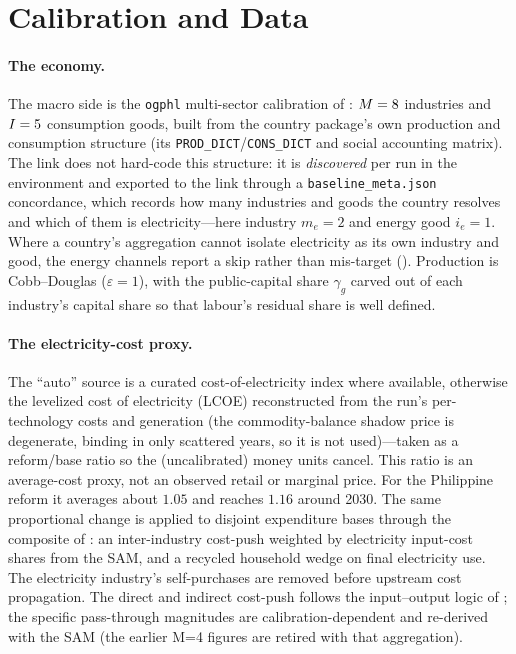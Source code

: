 \section{Calibration and Data}
\label{sec:calibration}

\paragraph{The economy.}
The macro side is the \texttt{ogphl} multi-sector calibration of \OGCore{}: $M=8$
industries and $I=5$ consumption goods, built from the country package's own
production and consumption structure (its \texttt{PROD\_DICT}/\texttt{CONS\_DICT} and
social accounting matrix). The link does not hard-code this structure: it is
\emph{discovered} per run in the \OGCore{} environment and exported to the link through a
\texttt{baseline\_meta.json} concordance, which records how many industries and goods the
country resolves and which of them is electricity---here industry $m_e=2$ and energy good
$i_e=1$. Where a country's aggregation cannot isolate electricity as its own industry and
good, the energy channels report a skip rather than mis-target ().
Production is Cobb--Douglas ($\varepsilon=1$), with the public-capital share
$\gamma_{g}$ carved out of each industry's capital share so that labour's residual share
is well defined.

\paragraph{The electricity-cost proxy.}
The ``auto'' source is a curated cost-of-electricity index where available, otherwise
the levelized cost of electricity (LCOE) reconstructed from the run's
per-technology costs and generation (the commodity-balance shadow price is degenerate,
binding in only scattered years, so it is not used)---taken as a reform/base ratio so the
(uncalibrated) money units cancel. This ratio is an average-cost proxy, not an observed
retail or marginal price. For the Philippine reform it averages about $1.05$ and reaches
$1.16$ around 2030. The same proportional change is applied to disjoint expenditure
bases through the composite of : an inter-industry cost-push weighted by
electricity input-cost shares from the SAM, and a recycled household wedge on final
electricity use. The electricity industry's self-purchases are removed before upstream
cost propagation. The direct and indirect cost-push follows the input--output logic of
; the
specific pass-through magnitudes are calibration-dependent and re-derived with the SAM
(the earlier M=4 figures are retired with that aggregation).

